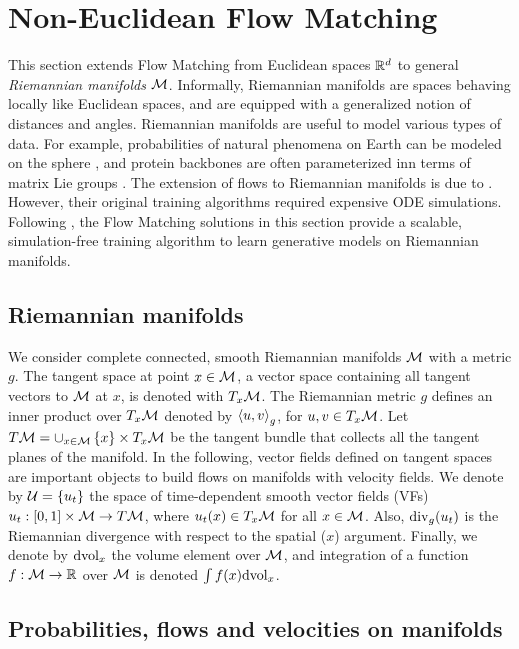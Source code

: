 \documentclass{fairmeta}
\numberwithin{equation}{section}
\begin{document}
\pagebreak
\section{Non-Euclidean Flow Matching}\label{s:fm_non_euclidean}

This section extends Flow Matching from Euclidean spaces $\mathbb R^d$ to general \emph{Riemannian manifolds} ${\mathcal{M}}$.
Informally, Riemannian manifolds are spaces behaving locally like Euclidean spaces, and are equipped with a generalized notion of distances and angles.
Riemannian manifolds are useful to model various types of data.
For example, probabilities of natural phenomena on Earth can be modeled on the sphere \cite{mathieu2020riemannian}, and protein backbones are often parameterized inn terms of matrix Lie groups \cite{jumper2021highly}.
The extension of flows to Riemannian manifolds is due to \citet{mathieu2020riemannian,lou2020riemannian}.
However, their original training algorithms required expensive ODE simulations.
Following \citet{chen2024flow}, the Flow Matching solutions in this section provide a scalable, simulation-free training algorithm to learn generative models on Riemannian manifolds.

\subsection{Riemannian manifolds}

We consider complete connected, smooth Riemannian manifolds ${\mathcal{M}}$ with a metric $g$.
The tangent space at point $x\in{\mathcal{M}}$, a vector space containing all tangent vectors to ${\mathcal{M}}$ at $x$, is denoted with $T_x{\mathcal{M}}$.
The Riemannian metric $g$ defines an inner product over $T_x {\mathcal{M}}$ denoted by $\left \langle u,v \right \rangle_g$, for $u,v\in T_x{\mathcal{M}}$.
Let $T{\mathcal{M}}=\cup_{x\in {\mathcal{M}}} \left\{x\right\}\times T_x{\mathcal{M}}$ be the tangent bundle that collects all the tangent planes of the manifold.
In the following, vector fields defined on tangent spaces are important objects to build flows on manifolds with velocity fields.
We denote by ${\mathcal{U}}=\left\{u_t\right\}$ the space of time-dependent smooth vector fields (VFs) $u_t :[0,1]\times {\mathcal{M}}\rightarrow T{\mathcal{M}}$, where $u_t(x)\in T_x{\mathcal{M}}$ for all $x\in{\mathcal{M}}$.
Also, $\mathrm{div}_g(u_t)$ is the Riemannian divergence with respect to the spatial ($x$) argument.
Finally, we denote by $\mathrm{d} \mathrm{vol}_x$ the volume element over ${\mathcal{M}}$, and integration of a function $f:{\mathcal{M}}\rightarrow\mathbb R$ over ${\mathcal{M}}$ is denoted $\int f(x) \mathrm{d} \mathrm{vol}_x$.%

\subsection{Probabilities, flows and velocities on manifolds}\label{s:flows_on_manifolds}
\end{document}

